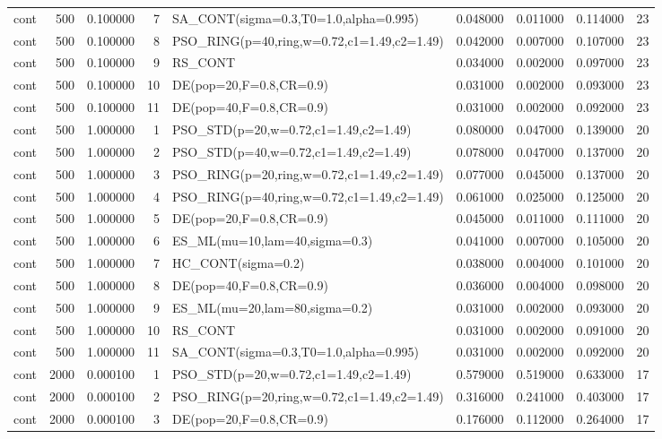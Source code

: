 \begin{longtable}{lrrrlrrrr}
cont & 500 & 0.100000 & 7 & SA\_CONT(sigma=0.3,T0=1.0,alpha=0.995) & 0.048000 & 0.011000 & 0.114000 & 23 \\
cont & 500 & 0.100000 & 8 & PSO\_RING(p=40,ring,w=0.72,c1=1.49,c2=1.49) & 0.042000 & 0.007000 & 0.107000 & 23 \\
cont & 500 & 0.100000 & 9 & RS\_CONT & 0.034000 & 0.002000 & 0.097000 & 23 \\
cont & 500 & 0.100000 & 10 & DE(pop=20,F=0.8,CR=0.9) & 0.031000 & 0.002000 & 0.093000 & 23 \\
cont & 500 & 0.100000 & 11 & DE(pop=40,F=0.8,CR=0.9) & 0.031000 & 0.002000 & 0.092000 & 23 \\
cont & 500 & 1.000000 & 1 & PSO\_STD(p=20,w=0.72,c1=1.49,c2=1.49) & 0.080000 & 0.047000 & 0.139000 & 20 \\
cont & 500 & 1.000000 & 2 & PSO\_STD(p=40,w=0.72,c1=1.49,c2=1.49) & 0.078000 & 0.047000 & 0.137000 & 20 \\
cont & 500 & 1.000000 & 3 & PSO\_RING(p=20,ring,w=0.72,c1=1.49,c2=1.49) & 0.077000 & 0.045000 & 0.137000 & 20 \\
cont & 500 & 1.000000 & 4 & PSO\_RING(p=40,ring,w=0.72,c1=1.49,c2=1.49) & 0.061000 & 0.025000 & 0.125000 & 20 \\
cont & 500 & 1.000000 & 5 & DE(pop=20,F=0.8,CR=0.9) & 0.045000 & 0.011000 & 0.111000 & 20 \\
cont & 500 & 1.000000 & 6 & ES\_ML(mu=10,lam=40,sigma=0.3) & 0.041000 & 0.007000 & 0.105000 & 20 \\
cont & 500 & 1.000000 & 7 & HC\_CONT(sigma=0.2) & 0.038000 & 0.004000 & 0.101000 & 20 \\
cont & 500 & 1.000000 & 8 & DE(pop=40,F=0.8,CR=0.9) & 0.036000 & 0.004000 & 0.098000 & 20 \\
cont & 500 & 1.000000 & 9 & ES\_ML(mu=20,lam=80,sigma=0.2) & 0.031000 & 0.002000 & 0.093000 & 20 \\
cont & 500 & 1.000000 & 10 & RS\_CONT & 0.031000 & 0.002000 & 0.091000 & 20 \\
cont & 500 & 1.000000 & 11 & SA\_CONT(sigma=0.3,T0=1.0,alpha=0.995) & 0.031000 & 0.002000 & 0.092000 & 20 \\
cont & 2000 & 0.000100 & 1 & PSO\_STD(p=20,w=0.72,c1=1.49,c2=1.49) & 0.579000 & 0.519000 & 0.633000 & 17 \\
cont & 2000 & 0.000100 & 2 & PSO\_RING(p=20,ring,w=0.72,c1=1.49,c2=1.49) & 0.316000 & 0.241000 & 0.403000 & 17 \\
cont & 2000 & 0.000100 & 3 & DE(pop=20,F=0.8,CR=0.9) & 0.176000 & 0.112000 & 0.264000 & 17 \\

\end{longtable}
